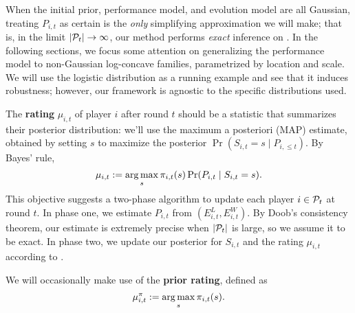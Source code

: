 When the initial prior, performance model, and evolution model are all Gaussian, treating $P_{i,t}$ as certain is the \emph{only} simplifying approximation we will make; that is, in the limit $|\mathcal{P}_t|\rightarrow\infty$, our method performs \emph{exact} inference on . In the following sections, we focus some attention on generalizing the performance model to non-Gaussian log-concave families, parametrized by location and scale. We will use the logistic distribution as a running example and see that it induces robustness; however, our framework is agnostic to the specific distributions used.%

The \textbf{rating} $\mu_{i,t}$ of player $i$ after round $t$ should be a statistic that summarizes their posterior distribution: we'll use the maximum a posteriori (MAP) estimate, obtained by setting $s$ to maximize the posterior $\Pr(S_{i,t}=s \mid P_{i,\le t})$. By Bayes' rule,
\begin{equation}
\label{eq:new-obj}
\mu_{i,t} := \operatorname*{arg\,max}_{s} \pi_{i,t}(s) \Pr(P_{i,t} \mid S_{i,t}=s).
\end{equation}
This objective suggests a two-phase algorithm to update each player $i\in\mathcal{P}_t$ at round $t$. In phase one, we estimate $P_{i,t}$ from $(E^L_{i,t}, E^W_{i,t})$. By Doob's consistency theorem, our estimate is extremely precise when $|\mathcal{P}_t|$ is large, so we assume it to be exact. In phase two, we update our posterior for $S_{i,t}$ and the rating $\mu_{i,t}$ according to .

We will occasionally make use of the \textbf{prior rating}, defined as
\begin{equation*}
\mu_{i,t}^\pi := \operatorname*{arg\,max}_{s} \pi_{i,t}(s).
\end{equation*}